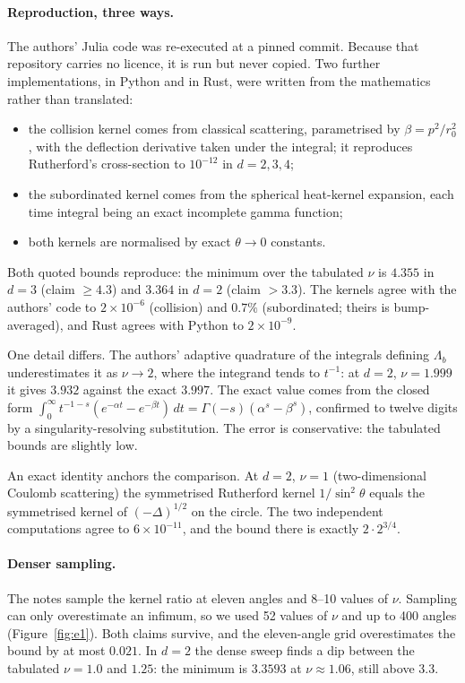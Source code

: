 \documentclass[11pt,a4paper]{article}
\begin{document}
\paragraph{Reproduction, three ways.}
The authors' Julia code was re-executed at a pinned commit. Because that repository carries no
licence, it is run but never copied. Two further implementations, in Python and in Rust, were
written from the mathematics rather than translated:
\begin{itemize}
  \item the collision kernel comes from classical scattering, parametrised by $\beta=p^2/r_0^2$,
        with the deflection derivative taken under the integral; it reproduces Rutherford's
        cross-section to $10^{-12}$ in $d=2,3,4$;
  \item the subordinated kernel comes from the spherical heat-kernel expansion, each time
        integral being an exact incomplete gamma function;
  \item both kernels are normalised by exact $\theta\to0$ constants.
\end{itemize}
Both quoted bounds reproduce: the minimum over the tabulated $\nu$ is $4.355$ in $d=3$ (claim
$\ge4.3$) and $3.364$ in $d=2$ (claim $>3.3$). The kernels agree with the authors' code to
$2\times10^{-6}$ (collision) and $0.7\%$ (subordinated; theirs is bump-averaged), and Rust
agrees with Python to $2\times10^{-9}$.

One detail differs. The authors' adaptive quadrature of the integrals defining $\Lambda_b$
underestimates it as $\nu\to2$, where the integrand tends to $t^{-1}$: at $d=2$, $\nu=1.999$ it
gives $3.932$ against the exact $3.997$. The exact value comes from the closed form
$\int_0^\infty t^{-1-s}(e^{-\alpha t}-e^{-\beta t})\,dt=\Gamma(-s)(\alpha^s-\beta^s)$, confirmed
to twelve digits by a singularity-resolving substitution. The error is conservative: the
tabulated bounds are slightly low.

An exact identity anchors the comparison. At $d=2$, $\nu=1$ (two-dimensional Coulomb scattering)
the symmetrised Rutherford kernel $1/\sin^2\theta$ equals the symmetrised kernel of
$(-\Delta)^{1/2}$ on the circle. The two independent computations agree to
$6\times10^{-11}$, and the bound there is exactly $2\cdot2^{3/4}$.

\paragraph{Denser sampling.}
The notes sample the kernel ratio at eleven angles and 8--10 values of $\nu$. Sampling can only
overestimate an infimum, so we used 52 values of $\nu$ and up to 400 angles
(Figure~\ref{fig:e1}). Both claims survive, and the eleven-angle grid overestimates the bound by at
most $0.021$. In $d=2$ the dense sweep finds a dip between the tabulated $\nu=1.0$ and $1.25$:
the minimum is $3.3593$ at $\nu\approx1.06$, still above $3.3$.
\end{document}
